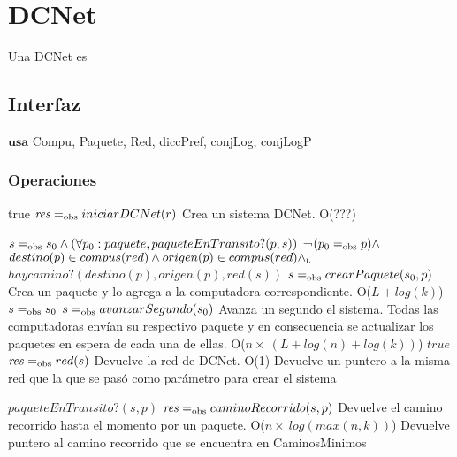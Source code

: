 
\section{DCNet}

Una DCNet es

\subsection{Interfaz}

$\textbf{usa}$  
Compu, Paquete, Red, diccPref, conjLog, conjLogP


\subsubsection*{Operaciones}


 {true}
 {$\text{\textit{res}} =_{\mathrm{obs}} iniciarDCNet(r)$}
 {Crea un sistema DCNet.}
 {O(???)}
 {}

 {$s =_{\mathrm{obs}} s_0 \land (\forall p_0:paquete,paqueteEnTransito?(p,s))$ ¬$(p_0 =_{\mathrm{obs}} p) \land$ \\ $destino(p) \in compus(red) \land origen(p) \in compus(red) \land_{\mathrm{\scriptscriptstyle{L}}} $ \\ $haycamino?(destino(p),origen(p),red(s))$}
 {$s =_{\mathrm{obs}} crearPaquete(s_0, p)$}
 {Crea un paquete y lo agrega a la computadora correspondiente.}
 {O($L + log(k)$)}
 {} 
 {$s =_{\mathrm{obs}} s_0$}
 {$s =_{\mathrm{obs}} avanzarSegundo(s_0)$}
 {Avanza un segundo el sistema. Todas las computadoras envían su respectivo paquete y en consecuencia se actualizar los paquetes en espera de cada una de ellas.}
 {O($n \times\ (L + log(n) + log(k))$)}
 {}
 {$true$}
 {$\text{\textit{res}} =_{\mathrm{obs}} red(s)$}
 {Devuelve la red de DCNet.}
 {O(1)}
 {Devuelve un puntero a la misma red que la que se pas\'o como par\'ametro para crear el sistema}

 {$paqueteEnTransito?(s,p)$}
 {$\text{\textit{res}} =_{\mathrm{obs}} caminoRecorrido(s,p)$}
 {Devuelve el camino recorrido hasta el momento por un paquete.}
 {O($n \times\  log(max(n,k))$)}
 {Devuelve puntero al camino recorrido que se encuentra en CaminosMinimos}

